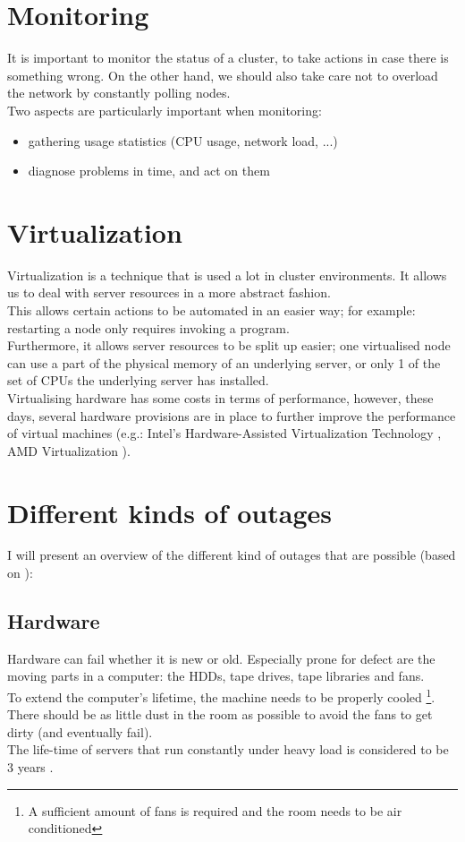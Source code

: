 \documentclass[12pt]{report}
\begin{document}
\section{Monitoring}
It is important to monitor the status of a cluster, to take actions in
case there is something wrong. On the other hand, we should also take
care not to overload the network by constantly polling nodes.\\
Two aspects are particularly important when monitoring: 
\begin{itemize}
\item gathering usage statistics (CPU usage, network load, ...)
\item diagnose problems in time, and act on them
\end{itemize}

\section{Virtualization}
Virtualization is a technique that is used a lot in cluster
environments. It allows us to deal with server resources in a more
abstract fashion.\\
This allows certain actions to be automated in an easier way;
for example: restarting a node only requires invoking a program.\\
Furthermore, it allows server resources to be split up easier; one
virtualised node can use a part of the physical memory of an
underlying server, or only 1 of the set of CPUs the underlying server
has installed.\\
Virtualising hardware has some costs in terms of performance, however,
these days, several hardware provisions are in place to further
improve the performance of virtual machines (e.g.: Intel's Hardware-Assisted
Virtualization Technology \cite{intel_havt}, AMD Virtualization
\cite{amd_virt}).

\section{Different kinds of outages}
I will present an overview of the different kind of outages that are
possible (based on \cite{ha_book}):
\subsection{Hardware}
Hardware can fail whether it is new or old. Especially prone for
defect are the moving parts in a computer: the HDDs, tape drives,
tape libraries and fans.\\
To extend the computer's lifetime, the machine needs to be properly
cooled \footnote{A sufficient amount of fans is required and the room needs to
be air conditioned}. \\
There should be as little dust in the room as possible to avoid the
fans to get dirty (and eventually fail).\\
The life-time of servers that run constantly under heavy load is
considered to be 3 years \cite{ms_cloud_cost}.
\end{document}
